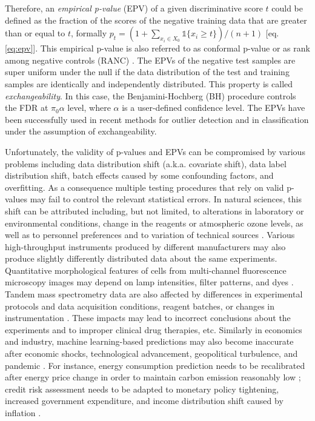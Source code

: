 \documentclass[10pt,letterpaper]{article}
\newcommand{\mathone}{\mathds{1}}
\begin{document}
Therefore, an {\em empirical p-value} (EPV) of a given discriminative score $t$ could be defined as the fraction of the scores of the negative training data that are greater than or equal to $t$, formally $p_t=(1+\sum_{x_i\in X_0} \mathone\{x_i \ge t\})/(n+1) \label{eq:epv}$ [eq. \ref{eq:epv}].
This empirical p-value is also referred to as conformal p-value \cite{bates2023testing} or as rank among negative controls (RANC) \cite{gao2023simultaneous}.
The EPVs of the negative test samples are super uniform under the null if the data distribution of the test and training samples are identically and independently distributed.
This property is called {\em exchangeability}.
In this case, the Benjamini-Hochberg (BH) procedure controls the FDR at $\pi_0\alpha$ level, where $\alpha$ is a user-defined confidence level.
The EPVs have been successfully used in recent methods for outlier detection \cite{bates2023testing,marandon2023adaptive} and in classification \cite{rava2021burden, angelopoulos2021learn} under the assumption of exchangeability. %

Unfortunately, the validity of p-values and EPVs can be compromised by various problems including  data distribution shift (a.k.a. covariate shift), data label distribution shift, batch effects \cite{Candela2009DatasetShift} caused by some confounding factors, and overfitting.
As a consequence multiple testing procedures that rely on valid p-values may fail to control the relevant statistical errors.
In natural sciences, this shift can be attributed including, but not limited, to alterations in laboratory or environmental conditions, change in the reagents or atmospheric ozone levels, as well as to personnel preferences and to variation of technical sources \cite{leek2010tackling}.
Various high-throughput instruments produced by different manufacturers may also produce slightly differently distributed data about the same experiments.
Quantitative morphological features of cells from multi-channel fluorescence microscopy images may depend on lamp intensities, filter patterns, and dyes \cite{bray2016cell}.
Tandem mass spectrometry data are also affected by differences in experimental protocols and data acquisition conditions, reagent batches, or changes in instrumentation \cite{phua2022perspectives, vcuklina2021diagnostics}.
These impacts may lead to incorrect conclusions about the experiments and to improper clinical drug therapies, etc.
Similarly in economics and industry, machine learning-based predictions may also become inaccurate after economic shocks, technological advancement, geopolitical turbulence, and pandemic \cite{ramey2016macroeconomic}.
For instance, energy consumption prediction needs to be recalibrated after energy price change in order to maintain carbon emission reasonably low \cite{clement2023coping}; credit risk assessment needs to be adapted to monetary policy tightening, increased government expenditure, and income distribution shift caused by inflation \cite{kritzman2012regime,guo2023predict, Zhang:EECS-2021-262}.
\end{document}
